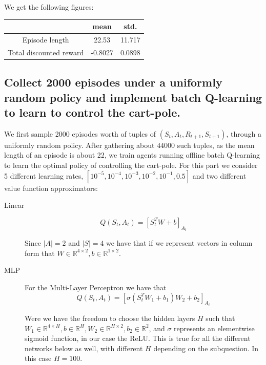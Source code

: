 \documentclass{article}
\begin{document}
We get the following figures:

\begin{center}
  \begin{tabular}{ |c|c|c| }
    \hline
     & mean & std. \\
    \hline
    Episode length & 22.53 & 11.717 \\ 
    Total discounted reward & -0.8027 & 0.0898 \\
    \hline
  \end{tabular}
\end{center}

\subsection{Collect 2000 episodes under a uniformly random policy and implement
  batch Q-learning to learn to control the cart-pole.}

We first sample 2000 episodes worth of tuples of $(S_t, A_t, R_{t+1}, S_{t+1})$,
through a uniformly random policy. After gathering about $44000$ such tuples, as
the mean length of an episode is about 22, we
train agents running offline batch Q-learning to learn the optimal policy
of controlling the cart-pole. For this part we consider 5 different learning
rates, $[10^{-5}, 10^{-4}, 10^{-3}, 10^{-2}, 10^{-1}, 0.5]$ and two different
value function approximators:

\begin{description}
\item[Linear]
  \begin{equation*}
    Q(S_t, A_t) = [S_t^TW + b]_{A_t}
  \end{equation*}

  Since $|A| = 2$ and $|S| = 4$ we have that if we represent vectors in column
  form that $W \in \mathbb{R}^{4 \times 2}, b \in \mathbb{R}^{1 \times 2}$.
\item[MLP]
  For the Multi-Layer Perceptron we have that
  \begin{equation*}
    Q(S_t, A_t) = [\sigma(S_t^TW_1 + b_1)W_2 + b_2]_{A_t}
  \end{equation*}

  Were we have the freedom to choose the hidden layers $H$ such that $W_1 \in
  \mathbb{R}^{4 \times H}, b \in \mathbb{R}^{H}, W_2 \in \mathbb{R}^{H \times 2},
  b_2 \in \mathbb{R}^{2}$, and $\sigma$ represents an elementwise sigmoid
  function, in our case the ReLU. This is true for all the different networks
  below as well, with different $H$ depending on the subquestion. In this case
  $H = 100$.
\end{description}
\end{document}
